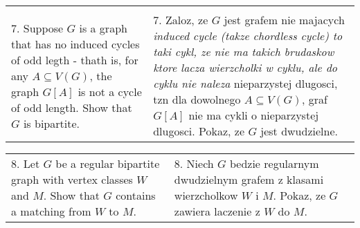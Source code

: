 \documentclass{article}[13pt]
\begin{document}
\begin{tabularx}{\textwidth}{ X X }
         & \\

        7. Suppose $G$ is a graph that has no induced cycles of odd legth - thath is, for any $A\subseteq V(G)$, the graph $G[A]$ is not a cycle of odd length. Show that $G$ is bipartite. & 7. Zaloz, ze $G$ jest grafem nie majacych \emph{induced cycle (takze chordless cycle) to taki cykl, ze nie ma takich brudaskow ktore lacza wierzcholki w cyklu, ale do cyklu nie naleza} nieparzystej dlugosci, tzn dla dowolnego $A\subseteq V(G)$, graf $G[A]$ nie ma cykli o nieparzystej dlugosci. Pokaz, ze $G$ jest dwudzielne.
    \end{tabularx}

    \begin{tabularx}{\textwidth}{ X X }
        8. Let $G$ be a regular bipartite graph with vertex classes $W$ and $M$. Show that $G$ contains a matching from $W$ to $M$. & 8. Niech $G$ bedzie regularnym dwudzielnym grafem z klasami wierzcholkow $W$ i $M$. Pokaz, ze $G$ zawiera laczenie z $W$ do $M$.
    \end{tabularx}
\end{document}
